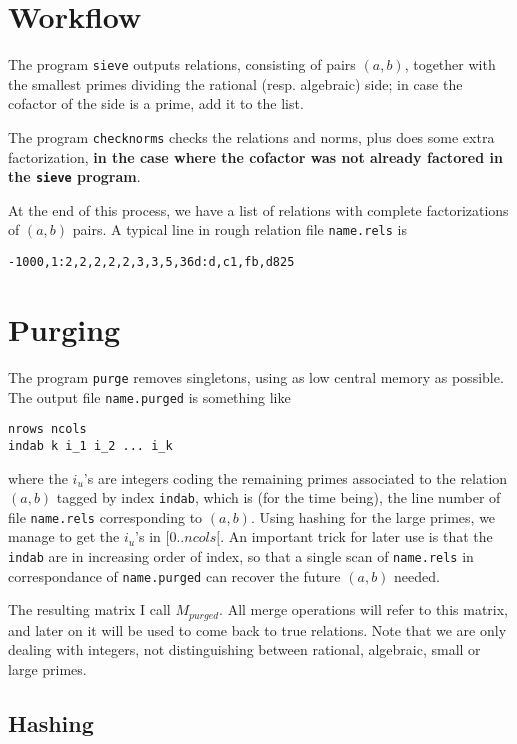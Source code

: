 \documentclass{article}
\begin{document}
\section{Workflow}

The program \verb+sieve+ outputs relations, consisting of pairs $(a,
b)$, together with the smallest primes dividing the rational
(resp. algebraic) side; in case the cofactor of the side is a prime,
add it to the list.

The program \verb+checknorms+ checks the relations and norms, plus does
some extra factorization, {\bf in the case where the cofactor was not
already factored in the {\tt sieve} program}.

At the end of this process, we have a list of relations with complete
factorizations of $(a, b)$ pairs. A typical line in rough relation
file \verb+name.rels+ is
\begin{verbatim}
-1000,1:2,2,2,2,2,3,3,5,36d:d,c1,fb,d825
\end{verbatim}

\section{Purging}

The program \verb+purge+ removes singletons, using as low central
memory as possible. The output file \verb+name.purged+ is
something like
\begin{verbatim}
nrows ncols
indab k i_1 i_2 ... i_k
\end{verbatim}
where the $i_u$'s are integers coding the remaining primes
associated to the relation $(a, b)$ tagged by index \verb+indab+,
which is (for the time being), the line number of file
\verb+name.rels+ corresponding to $(a, b)$. Using hashing for the
large primes, we manage to get the $i_u$'s in $[0..ncols[$. An
important trick for later use is that the \verb+indab+ are in
increasing order of index, so that a single scan of \verb+name.rels+
in correspondance of \verb+name.purged+ can recover the future $(a,
b)$ needed. 

The resulting matrix I call $M_{purged}$. All merge operations will
refer to this matrix, and later on it will be used to come back to
true relations. Note that we are only dealing with integers, not
distinguishing between rational, algebraic, small or large primes.

\subsection{Hashing}
\end{document}

